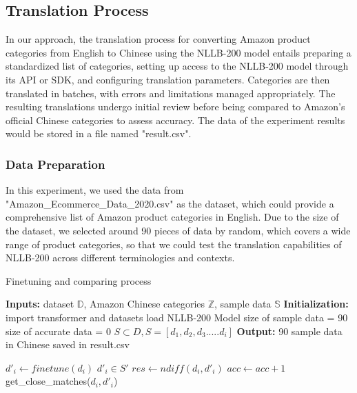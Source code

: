 \documentclass[sigconf]{acmart}
\begin{document}
\subsection{Translation Process}
In our approach, the translation process for converting Amazon product categories from English to Chinese using the NLLB-200 model\cite{Meta} entails preparing a standardized list of categories, setting up access to the NLLB-200 model through its API or SDK, and configuring translation parameters. Categories are then translated in batches, with errors and limitations managed appropriately. The resulting translations undergo initial review before being compared to Amazon's official Chinese categories to assess accuracy. The data of the experiment results would be stored in a file named "result.csv".


\subsubsection{Data Preparation}
In this experiment, we used the data from "Amazon\_Ecommerce\_Data\_2020.csv"\cite{PromptCloud} as the dataset, which could provide a comprehensive list of Amazon product categories in English. Due to the size of the dataset, we selected around 90 pieces of data by random, which covers a wide range of product categories, so that we could test the translation capabilities of NLLB-200 across different terminologies and contexts. 


\begin{algorithm}[t]
\caption{Finetuning and comparing process}
\label{bicluster}
\begin{algorithmic}[1]

\Statex\textbf{Inputs:} 
\Statex\hspace{\algorithmicindent} dataset $\mathbb{D}$, Amazon Chinese categories $\mathbb{Z}$, sample data $\mathbb{S}$
\Statex\textbf{Initialization:}
\Statex\hspace{\algorithmicindent} import transformer and datasets
\Statex\hspace{\algorithmicindent} load NLLB-200 Model
\Statex\hspace{\algorithmicindent} size of sample data = 90
\Statex\hspace{\algorithmicindent} size of accurate data = 0
\Statex\hspace{\algorithmicindent} $S\subset{D}, S = [d_1,d_2,d_3.....d_i]$
\Statex\textbf{Output:} 90 sample data in Chinese saved in result.csv 

\State $d'_i\leftarrow finetune(d_i)$
\State $d'_i\in S'$
\EndFor
\EndIf
{}
\State $res\leftarrow ndiff(d_i,d'_i)$
\State $acc\leftarrow acc+1$
\Else
\State get\_close\_matches($d_i,d'_i$)
\EndIf
\EndFor
\EndProcedure
\end{algorithmic}
\end{algorithm}
\end{document}
